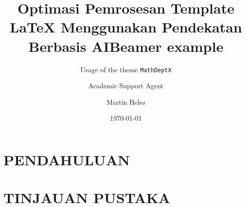 \documentclass{beamer}
\title{Optimasi Pemrosesan Template LaTeX Menggunakan Pendekatan Berbasis AI}
\author{Academic Support Agent}
\date{\today}
\begin{document}
\maketitle

\begin{abstract}

\end{abstract}

\chapter{PENDAHULUAN}


\chapter{TINJAUAN PUSTAKA}






\usepackage[utf8]{inputenx} %
\usepackage{babel}          %
\usepackage{csquotes}       %
\usepackage{microtype}      %
\usepackage{amssymb}        %
\usepackage{mathtools}      %
\usepackage[absolute, overlay]{textpos} %
\setlength{\TPHorizModule}{\paperwidth} %
\setlength{\TPVertModule}{\paperheight} %
\usepackage{tikz}
\usetikzlibrary{overlay-beamer-styles}  %


\author{Martin Helsø}
\title{Beamer example}
\subtitle{Usage of the theme \texttt{MathDeptX}}
\end{document}
